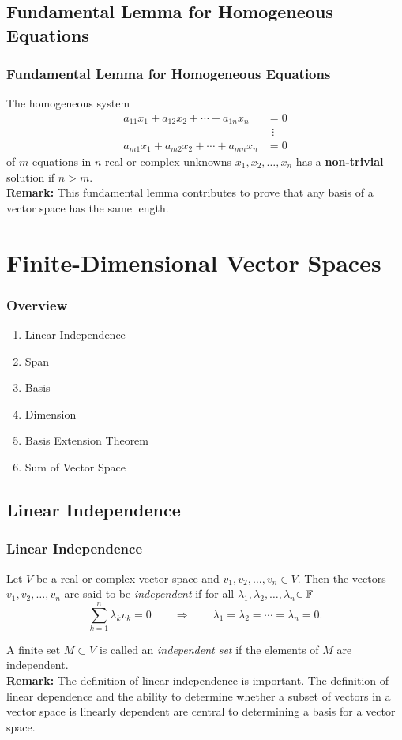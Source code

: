 \documentclass[12pt, t]{beamer}
\renewcommand{\emph}[1]{{\color{Turquoise3}\textsl{#1}}}
\newcommand{\myseries}[2]{$#1_1,#1_2,\dots,#1_#2$}
\newcommand{\nullspace}{~\\[15pt]}
\newcommand{\remark}{\textbf{Remark: }}
\begin{document}
\subsection{Fundamental Lemma for Homogeneous Equations}
\begin{frame}
    \frametitle{Fundamental Lemma for Homogeneous Equations}
    The homogeneous system
    \begin{align*}
        a_{11}x_1+a_{12}x_2+\cdots+a_{1n}x_n & =0       \\
                                             & ~~\vdots \\
        a_{m1}x_1+a_{m2}x_2+\cdots+a_{mn}x_n & =0
    \end{align*}
    of $m$ equations in $n$ real or complex unknowns \myseries{x}{n} has a \textbf{non-trivial} solution if $n>m$.\\[15pt]

    \textbf{Remark:} This fundamental lemma contributes to prove that any basis of a vector space has the same length.

\end{frame}

\section{Finite-Dimensional Vector Spaces}

\begin{frame}
    \frametitle{Overview}
    \begin{enumerate}
        \item Linear Independence
        \item Span
        \item Basis
        \item Dimension
        \item Basis Extension Theorem
        \item Sum of Vector Space
    \end{enumerate}
\end{frame}

\subsection{Linear Independence}
\begin{frame}
    \frametitle{Linear Independence}
    Let $V$ be a real or complex vector space and \myseries{v}{n}$\in V$. Then the vectors \myseries{v}{n} are said to be \emph{independent} if for all \myseries{\lambda}{n}$\in\mathbb{F}$ \vspace*{-4mm}
    \[\sum_{k=1}^{n}\lambda_kv_k=0\qquad\Rightarrow\qquad\lambda_1=\lambda_2=\cdots=\lambda_n=0.\]

    A finite set $M\subset V$ is called an \emph{independent set} if the elements of $M$ are independent.
    \nullspace
    \remark The definition of linear independence is important. The definition of linear dependence and the ability to determine whether a subset of vectors in a vector space is linearly dependent are central to determining a basis for a vector space.
\end{frame}
\end{document}
